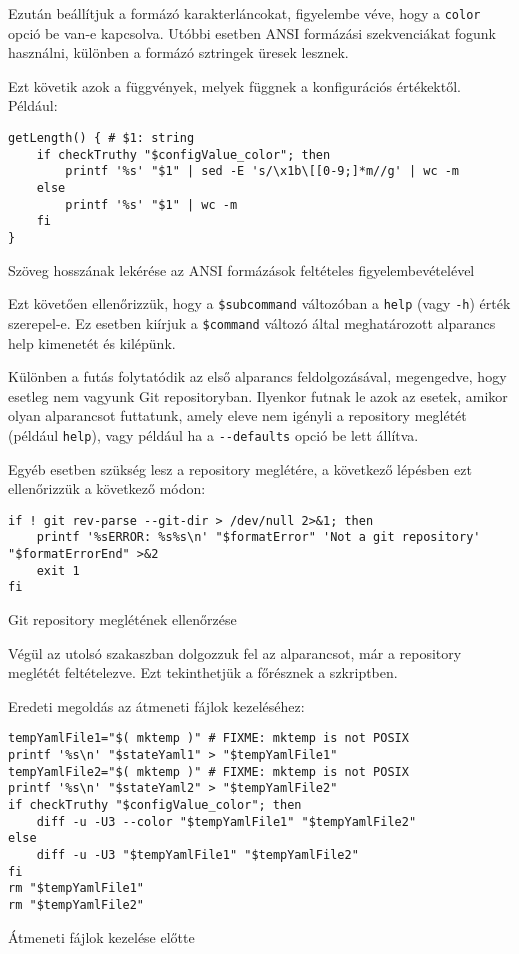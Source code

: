 \documentclass[
]{elteikthesis}[2025/03/25]
\begin{document}
Ezután beállítjuk a formázó karakterláncokat,
figyelembe véve, hogy a \verb|color| opció be van-e kapcsolva.
Utóbbi esetben ANSI formázási szekvenciákat fogunk használni,
különben a formázó sztringek üresek lesznek.

Ezt követik azok a függvények, melyek függnek a konfigurációs értékektől.
Például:

\begin{listing}[H]
\begin{verbatim}
getLength() { # $1: string
    if checkTruthy "$configValue_color"; then
        printf '%s' "$1" | sed -E 's/\x1b\[[0-9;]*m//g' | wc -m
    else
        printf '%s' "$1" | wc -m
    fi
}
\end{verbatim}
\caption{Szöveg hosszának lekérése az ANSI formázások feltételes figyelembevételével}
\end{listing}

Ezt követően ellenőrizzük, hogy a \verb|$subcommand| változóban
a \verb|help| (vagy \verb|-h|) érték szerepel-e.
Ez esetben kiírjuk a \verb|$command| változó által meghatározott alparancs help kimenetét és kilépünk.

Különben a futás folytatódik az első alparancs feldolgozásával,
megengedve, hogy esetleg nem vagyunk Git repositoryban.
Ilyenkor futnak le azok az esetek, amikor olyan alparancsot futtatunk,
amely eleve nem igényli a repository meglétét (például \verb|help|),
vagy például ha a \verb|--defaults| opció be lett állítva.

Egyéb esetben szükség lesz a repository meglétére,
a következő lépésben ezt ellenőrizzük a következő módon:

\begin{listing}[H]
\begin{verbatim}
if ! git rev-parse --git-dir > /dev/null 2>&1; then
    printf '%sERROR: %s%s\n' "$formatError" 'Not a git repository' "$formatErrorEnd" >&2
    exit 1
fi
\end{verbatim}
\caption{Git repository meglétének ellenőrzése}
\end{listing}

Végül az utolsó szakaszban dolgozzuk fel az alparancsot, már a repository meglétét feltételezve.
Ezt tekinthetjük a főrésznek a szkriptben.


Eredeti megoldás az átmeneti fájlok kezeléséhez:

\begin{listing}[H]
\begin{verbatim}
tempYamlFile1="$( mktemp )" # FIXME: mktemp is not POSIX
printf '%s\n' "$stateYaml1" > "$tempYamlFile1"
tempYamlFile2="$( mktemp )" # FIXME: mktemp is not POSIX
printf '%s\n' "$stateYaml2" > "$tempYamlFile2"
if checkTruthy "$configValue_color"; then
    diff -u -U3 --color "$tempYamlFile1" "$tempYamlFile2"
else
    diff -u -U3 "$tempYamlFile1" "$tempYamlFile2"
fi
rm "$tempYamlFile1"
rm "$tempYamlFile2"
\end{verbatim}
\caption{Átmeneti fájlok kezelése előtte}
\end{listing}
\end{document}
